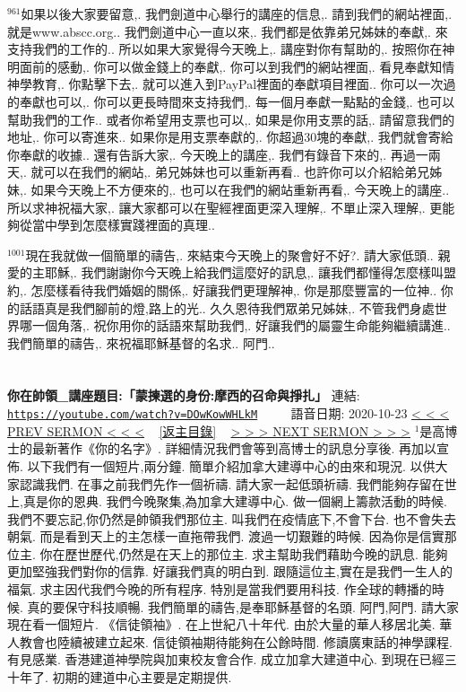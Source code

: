 \documentclass{book}
\begin{document}
$^{961}$如果以後大家要留意,.
我們劍道中心舉行的講座的信息,.
請到我們的網站裡面,.
就是www.abscc.org..
我們劍道中心一直以來,.
我們都是依靠弟兄姊妹的奉獻,.
來支持我們的工作的..
所以如果大家覺得今天晚上,.
講座對你有幫助的,.
按照你在神明面前的感動,.
你可以做金錢上的奉獻,.
你可以到我們的網站裡面,.
看見奉獻知情神學教育,.
你點擊下去,.
就可以進入到PayPal裡面的奉獻項目裡面..
你可以一次過的奉獻也可以,.
你可以更長時間來支持我們,.
每一個月奉獻一點點的金錢,.
也可以幫助我們的工作..
或者你希望用支票也可以,.
如果是你用支票的話,.
請留意我們的地址,.
你可以寄進來..
如果你是用支票奉獻的,.
你超過30塊的奉獻,.
我們就會寄給你奉獻的收據..
還有告訴大家,.
今天晚上的講座,.
我們有錄音下來的,.
再過一兩天,.
就可以在我們的網站,.
弟兄姊妹也可以重新再看..
也許你可以介紹給弟兄姊妹,.
如果今天晚上不方便來的,.
也可以在我們的網站重新再看,.
今天晚上的講座..
所以求神祝福大家,.
讓大家都可以在聖經裡面更深入理解,.
不單止深入理解,.
更能夠從當中學到怎麼樣實踐裡面的真理..

$^{1001}$現在我就做一個簡單的禱告,.
來結束今天晚上的聚會好不好?.
請大家低頭..
親愛的主耶穌,.
我們謝謝你今天晚上給我們這麼好的訊息,.
讓我們都懂得怎麼樣叫盟約,.
怎麼樣看待我們婚姻的關係,.
好讓我們更理解神,.
你是那麼豐富的一位神..
你的話語真是我們腳前的燈,路上的光..
久久恩待我們眾弟兄姊妹,.
不管我們身處世界哪一個角落,.
祝你用你的話語來幫助我們,.
好讓我們的屬靈生命能夠繼續講進..
我們簡單的禱告,.
來祝福耶穌基督的名求..
阿門..
\newpage



\section{}
\label{sec:DOwKowWHLkM}
\textbf{你在帥領\_講座題目:「蒙揀選的身份:摩西的召命與掙扎」}
\newline
\newline
連結: \href{https://youtube.com/watch?v=DOwKowWHLkM}{\texttt{https://youtube.com/watch?v=DOwKowWHLkM}} ~~~~ 語音日期: 2020-10-23
\newline
\newline
\hyperref[sec:n5DpA1Db_0M]{\small{< < < PREV SERMON < < <}}
~
\hyperref[sec:index]{\small{[返主目錄]}}
~
\hyperref[sec:0]{\small{> > > NEXT SERMON > > >}}
\newline
\newline
$^{1}$是高博士的最新著作《你的名字》.
詳細情況我們會等到高博士的訊息分享後.
再加以宣佈.
以下我們有一個短片,兩分鐘.
簡單介紹加拿大建導中心的由來和現況.
以供大家認識我們.
在事之前我們先作一個祈禱.
請大家一起低頭祈禱.
我們能夠存留在世上,真是你的恩典.
我們今晚聚集,為加拿大建導中心.
做一個網上籌款活動的時候.
我們不要忘記,你仍然是帥領我們那位主.
叫我們在疫情底下,不會下台.
也不會失去朝氣.
而是看到天上的主怎樣一直拖帶我們.
渡過一切艱難的時候.
因為你是信實那位主.
你在歷世歷代,仍然是在天上的那位主.
求主幫助我們藉助今晚的訊息.
能夠更加堅強我們對你的信靠.
好讓我們真的明白到.
跟隨這位主,實在是我們一生人的福氣.
求主因代我們今晚的所有程序.
特別是當我們要用科技.
作全球的轉播的時候.
真的要保守科技順暢.
我們簡單的禱告,是奉耶穌基督的名頭.
阿門,阿門.
請大家現在看一個短片.
《信徒領袖》.
在上世紀八十年代.
由於大量的華人移居北美.
華人教會也陸續被建立起來.
信徒領袖期待能夠在公餘時間.
修讀廣東話的神學課程.
有見感業.
香港建道神學院與加東校友會合作.
成立加拿大建道中心.
到現在已經三十年了.
初期的建道中心主要是定期提供.
\end{document}
